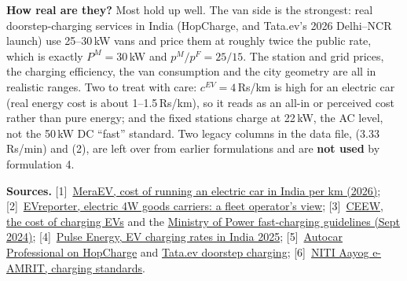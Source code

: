 \begin{table}[H]
\centering
\caption{Cost constants held fixed across all instances, with a reality check.}

\end{table}

\begin{table}[H]
\centering
\caption{Fleet, charging and geometry constants held fixed across all instances, with a reality check.}

\end{table}

\textbf{How real are they?} Most hold up well. The van side is the strongest: real doorstep-charging services in India (HopCharge, and Tata.ev's 2026 Delhi--NCR launch) use 25--30\,kW vans and price them at roughly twice the public rate, which is exactly $P^M=30$\,kW and $p^M/p^F=25/15$. The station and grid prices, the charging efficiency, the van consumption and the city geometry are all in realistic ranges. Two to treat with care: $c^{EV}=4$\,Rs/km is high for an electric car (real energy cost is about 1--1.5\,Rs/km), so it reads as an all-in or perceived cost rather than pure energy; and the fixed stations charge at 22\,kW, the AC level, not the 50\,kW DC ``fast'' standard. Two legacy columns in the data file,  (3.33\,Rs/min) and  (2), are left over from earlier formulations and are \textbf{not used} by formulation 4.

\textbf{Sources.} [1]~\href{https://www.meraev.com/blog/cost-of-running-electric-car-in-india-per-km-2026}{MeraEV, cost of running an electric car in India per km (2026)}; [2]~\href{https://evreporter.com/electric-4w-goods-carriers-a-fleet-operators-point-of-view/}{EVreporter, electric 4W goods carriers: a fleet operator's view}; [3]~\href{https://www.ceew.in/cef/masterclass/explains/what-is-the-cost-of-charging-electric-vehicles}{CEEW, the cost of charging EVs} and the \href{https://www.autocarpro.in/news/ministry-of-power-revises-guidelines-for-ev-fast-charging-122714}{Ministry of Power fast-charging guidelines (Sept 2024)}; [4]~\href{https://pulseenergy.io/blog/ev-charging-rates}{Pulse Energy, EV charging rates in India 2025}; [5]~\href{https://www.autocarpro.in/interview/hopcharge-aims-to-triple-its-mobile-ev-charging-fleet-116466}{Autocar Professional on HopCharge} and \href{https://www.91wheels.com/news/tata-brings-ev-charging-to-your-doorstep-in-delhi-ncr}{Tata.ev doorstep charging}; [6]~\href{https://e-amrit.niti.gov.in/standards-and-specifications}{NITI Aayog e-AMRIT, charging standards}.

